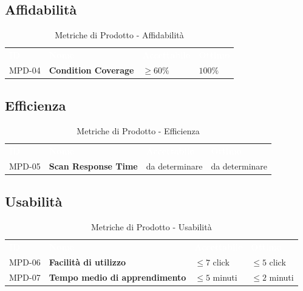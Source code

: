 \documentclass[a4paper, 11pt]{article}
\begin{document}
\subsection{Affidabilità}
\begin{table}[h!]
    \centering
    \begin{tabular}{>{\centering\arraybackslash}m{1.5cm} p{6cm} >{\centering\arraybackslash}m{3cm} >{\centering\arraybackslash}m{2.5cm}}
        \rowcolor{AccentColor}
        \textcolor{white}{\textbf{ID}} & \textcolor{white}{\textbf{Nome}} & \textcolor{white}{\textbf{Accettabile}} & \textcolor{white}{\textbf{Ottimo}} \\
        MPD-04 & \textbf{Condition Coverage } & $\geq 60\%$ & $100\%$ \\
    \end{tabular}
    \caption{Metriche di Prodotto - Affidabilità}
\end{table}

\newpage

\subsection{Efficienza}
\begin{table}[h!]
    \centering
    \begin{tabular}{>{\centering\arraybackslash}m{1.5cm} p{6cm} >{\centering\arraybackslash}m{3cm} >{\centering\arraybackslash}m{2.5cm}}
        \rowcolor{AccentColor}
        \textcolor{white}{\textbf{ID}} & \textcolor{white}{\textbf{Nome}} & \textcolor{white}{\textbf{Accettabile}} & \textcolor{white}{\textbf{Ottimo}} \\
        MPD-05 & \textbf{Scan Response Time} & da determinare & da determinare \\
    \end{tabular}
    \caption{Metriche di Prodotto - Efficienza}
\end{table}

\subsection{Usabilità}
\begin{table}[h!]
    \centering
    \begin{tabular}{>{\centering\arraybackslash}m{1.5cm} p{6cm} >{\centering\arraybackslash}m{3cm} >{\centering\arraybackslash}m{2.5cm}}
        \rowcolor{AccentColor}
        \textcolor{white}{\textbf{ID}} & \textcolor{white}{\textbf{Nome}} & \textcolor{white}{\textbf{Accettabile}} & \textcolor{white}{\textbf{Ottimo}} \\
        MPD-06 & \textbf{Facilità di utilizzo} & $\leq 7$ click & $\leq 5$ click\\
        MPD-07 & \textbf{Tempo medio di apprendimento} & $\leq 5$ minuti & $\leq 2$ minuti\\
    \end{tabular}
    \caption{Metriche di Prodotto - Usabilità}
\end{table}
\end{document}
